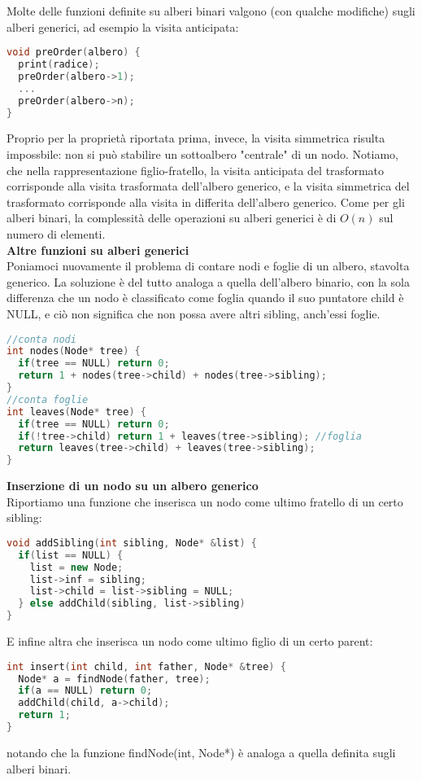 \documentclass[a4paper,12pt]{article}
\begin{document}
Molte delle funzioni definite su alberi binari valgono (con qualche modifiche) sugli alberi generici, ad esempio la visita anticipata:
\begin{lstlisting}[language=C++]
void preOrder(albero) {
  print(radice);
  preOrder(albero->1);
  ...
  preOrder(albero->n);
}
\end{lstlisting}
Proprio per la proprietà riportata prima, invece, la visita simmetrica risulta impossbile: non si può stabilire un sottoalbero
"centrale" di un nodo.
Notiamo, che nella rappresentazione figlio-fratello, la visita anticipata del trasformato corrisponde alla visita trasformata
dell'albero generico, e la visita simmetrica del trasformato corrisponde alla visita in differita dell'albero generico. Come per gli
alberi binari, la complessità delle operazioni su alberi generici è di $O(n)$ sul numero di elementi. \\
\textbf{Altre funzioni su alberi generici} \\
Poniamoci nuovamente il problema di contare nodi e foglie di un albero, stavolta generico. La soluzione 
è del tutto analoga a quella dell'albero binario, con la sola differenza che un nodo è classificato come foglia
quando il suo puntatore child è NULL, e ciò non significa che non possa avere altri sibling, anch'essi foglie.
\begin{lstlisting}[language=C++]
//conta nodi
int nodes(Node* tree) {
  if(tree == NULL) return 0;
  return 1 + nodes(tree->child) + nodes(tree->sibling);
}
//conta foglie
int leaves(Node* tree) {
  if(tree == NULL) return 0;
  if(!tree->child) return 1 + leaves(tree->sibling); //foglia
  return leaves(tree->child) + leaves(tree->sibling);
}
\end{lstlisting}
\textbf{Inserzione di un nodo su un albero generico} \\
Riportiamo una funzione che inserisca un nodo come ultimo fratello di un certo sibling:
\begin{lstlisting}[language=C++]
void addSibling(int sibling, Node* &list) {
  if(list == NULL) {
    list = new Node;
    list->inf = sibling;
    list->child = list->sibling = NULL;
  } else addChild(sibling, list->sibling)
}
\end{lstlisting}
E infine altra che inserisca un nodo come ultimo figlio di un certo parent:
\begin{lstlisting}[language=C++]
int insert(int child, int father, Node* &tree) {
  Node* a = findNode(father, tree);
  if(a == NULL) return 0;
  addChild(child, a->child);
  return 1;
}
\end{lstlisting}
notando che la funzione findNode(int, Node*) è analoga a quella definita sugli alberi binari.
\end{document}
